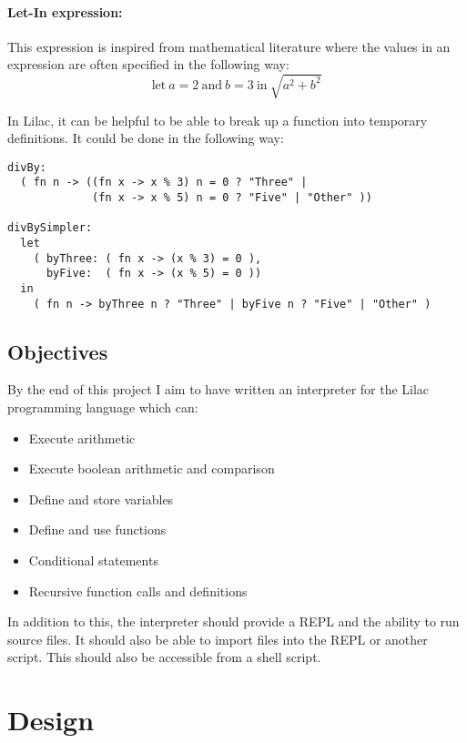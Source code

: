 \documentclass[a4paper, 12pt]{article}
\begin{document}
\paragraph{Let-In expression:}
This expression is inspired from mathematical literature where the values in an expression are often specified in the following way:\\

\[ \text{let}\ a=2\ \text{and}\ b=3\ \text{in}\ \sqrt{a^2+b^2} \]

In Lilac, it can be helpful to be able to break up a function into temporary definitions. It could be done in the following way:\\
\begin{verbatim}
divBy:
  ( fn n -> ((fn x -> x % 3) n = 0 ? "Three" | 
             (fn x -> x % 5) n = 0 ? "Five" | "Other" ))

divBySimpler:
  let 
    ( byThree: ( fn x -> (x % 3) = 0 ),
      byFive:  ( fn x -> (x % 5) = 0 ))
  in
    ( fn n -> byThree n ? "Three" | byFive n ? "Five" | "Other" )
\end{verbatim}
\subsection{Objectives}\label{sec:objectives}
By the end of this project I aim to have written an interpreter for the Lilac programming language which can:\\
\begin{itemize}
\item 
Execute arithmetic
\item 
Execute boolean arithmetic and comparison
\item 
Define and store variables
\item
Define and use functions
\item 
Conditional statements
\item 
Recursive function calls and definitions
\end{itemize}

In addition to this, the interpreter should provide a REPL and the ability to run source files. It should also be able to import files into the REPL or another script. This should also be accessible from a shell script.

\section{Design}\label{sec:design}
\end{document}
